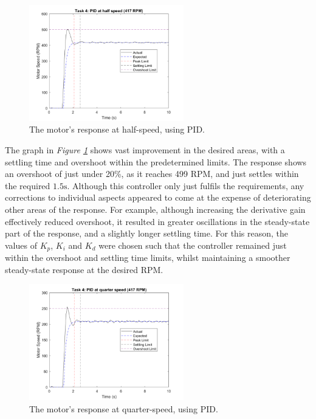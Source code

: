 \documentclass[11pt, onecolumn]{article}
\begin{document}
\begin{figure}[h!]
    \centering
    \includegraphics[width=0.6\textwidth]{q4-pid2.png}
    \caption{The motor's response at half-speed, using PID.}
    \label{fig:q4-pid2}
\end{figure}
\par The graph in \textit{Figure \ref{fig:q4-pid2}} shows vast improvement in the desired areas, with a settling time and overshoot within the predetermined limits. The response shows an overshoot of just under 20\%, as it reaches 499 RPM, and just settles within the required $1.5 \text{s}$. Although this controller only just fulfils the requirements, any corrections to individual aspects appeared to come at the expense of deteriorating other areas of the response. For example, although increasing the derivative gain effectively reduced overshoot, it resulted in greater oscillations in the steady-state part of the response, and a slightly longer settling time. For this reason, the values of $K_p$, $K_i$ and $K_d$ were chosen such that the controller remained just within the overshoot and settling time limits, whilst maintaining a smoother steady-state response at the desired RPM.
\begin{figure}[h!]
    \centering
    \includegraphics[width=0.6\textwidth]{q4-pid3.png}
    \caption{The motor's response at quarter-speed, using PID.}
    \label{fig:q4-pid3}
\end{figure}
\end{document}
